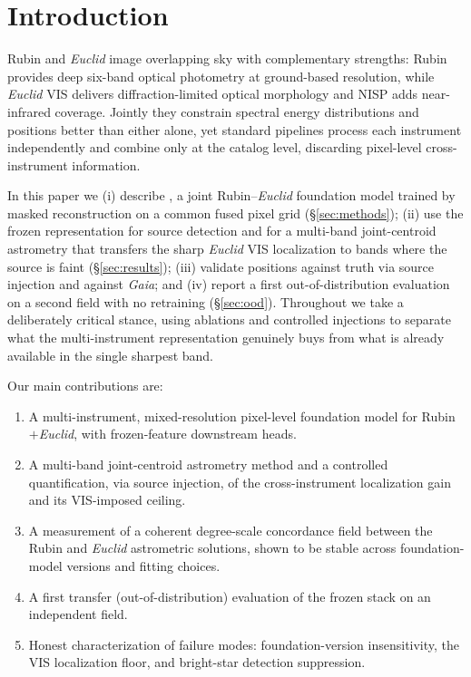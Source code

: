 \section{Introduction}
\label{sec:intro}

Rubin and \textit{Euclid} image overlapping sky with complementary strengths:
Rubin provides deep six-band optical photometry at ground-based resolution,
while \textit{Euclid} VIS delivers diffraction-limited optical morphology and
NISP adds near-infrared coverage. Jointly they constrain spectral energy
distributions and positions better than either alone, yet standard pipelines
process each instrument independently and combine only at the catalog level,
discarding pixel-level cross-instrument information.


In this paper we (i) describe \jaisp{}, a joint Rubin--\textit{Euclid}
foundation model trained by masked reconstruction on a common fused pixel grid
(\S\ref{sec:methods}); (ii) use the frozen representation for source detection
and for a multi-band joint-centroid astrometry that transfers the sharp
\textit{Euclid} VIS localization to bands where the source is faint
(\S\ref{sec:results}); (iii) validate positions against truth via
source injection and against \textit{Gaia}; and (iv) report a first
out-of-distribution evaluation on a second field with no retraining
(\S\ref{sec:ood}). Throughout we take a deliberately critical stance, using
ablations and controlled injections to separate what the multi-instrument
representation genuinely buys from what is already available in the single
sharpest band.

Our main contributions are:
\begin{enumerate}
  \item A multi-instrument, mixed-resolution pixel-level foundation model for
    Rubin$+$\textit{Euclid}, with frozen-feature downstream heads.
  \item A multi-band joint-centroid astrometry method and a controlled
    quantification, via source injection, of the cross-instrument localization
    gain and its VIS-imposed ceiling.
  \item A measurement of a coherent degree-scale concordance field between the
    Rubin and \textit{Euclid} astrometric solutions, shown to be stable across
    foundation-model versions and fitting choices.
  \item A first transfer (out-of-distribution) evaluation of the frozen stack
    on an independent field.
  \item Honest characterization of failure modes: foundation-version
    insensitivity, the VIS localization floor, and bright-star detection
    suppression.
\end{enumerate}
